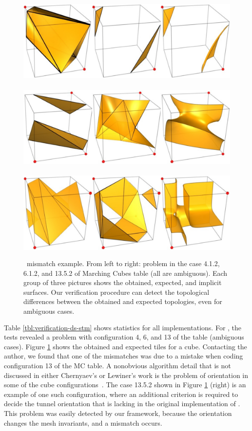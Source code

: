
\begin{figure}[t]
\centering
\includegraphics[width=0.3\linewidth,keepaspectratio=true]
{chapter3/figures/mc33-case-02.pdf} ~~~~
\includegraphics[width=0.3\linewidth,keepaspectratio=true]
{chapter3/figures/mc33-case-01.pdf} ~~~~
\includegraphics[width=0.3\linewidth,keepaspectratio=true]
{chapter3/figures/mc33-case-00.pdf} 
\caption{\mclewiner\ mismatch example. From left to right: problem in
  the case 4.1.2, 6.1.2, and 13.5.2 of Marching Cubes table (all are
  ambiguous). Each group of three pictures shows the obtained,
  expected, and implicit surfaces. Our verification procedure can
  detect the topological differences between the obtained and expected
  topologies, even for ambiguous cases.}
\label{fig:problem-mclewiner}
\end{figure}

Table \ref{tbl:verification-ds-stm} shows statistics for all 
implementations. For 
\mclewiner, the tests revealed a problem with configuration 4, 6, and 13 of
the table (ambiguous cases). Figure \ref{fig:problem-mclewiner} shows the
obtained and expected tiles for a cube. 
Contacting the author,
we found that one of the mismatches was due
to a mistake when coding configuration 13 of the MC table. A
nonobvious algorithm detail that is not
discussed in either Chernyaev's or Lewiner's work is the problem of orientation in
some of the cube configurations~\cite{Lewiner:2010:PC}. The case 13.5.2 shown in Figure
\ref{fig:problem-mclewiner} (right) is an example of one such configuration, where
an additional criterion is required to decide the tunnel orientation that is
lacking in the original implementation of \mclewiner. This problem was easily
detected by our framework, because the orientation changes the mesh
invariants, and a mismatch occurs.

